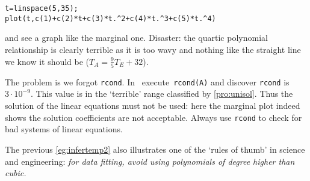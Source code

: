 \begin{example}
\begin{solution}
\begin{verbatim}
t=linspace(5,35);
plot(t,c(1)+c(2)*t+c(3)*t.^2+c(4)*t.^3+c(5)*t.^4)
\end{verbatim}
and see a graph like the marginal one.
Disaster: the quartic polynomial relationship is clearly terrible as it is too wavy and nothing like the straight line we know it should be (\(T_A=\frac95T_E+32\)).

The problem is we forgot \verb|rcond|.
In \script\ execute~\verb|rcond(A)| and discover \verb|rcond| is \(3\cdot10^{-9}\).
This value is in the `terrible' range classified by \autoref{pro:unisol}.
Thus the solution of the linear equations must not be used: here the marginal plot indeed shows the solution coefficients are not acceptable.
Always use \verb|rcond| to check for bad systems of linear equations.
\end{solution}
\end{example}

The previous \autoref{eg:infertemp2} also illustrates one of the `rules of thumb' in science and engineering: \emph{for data fitting, avoid using polynomials of degree higher than cubic.}


